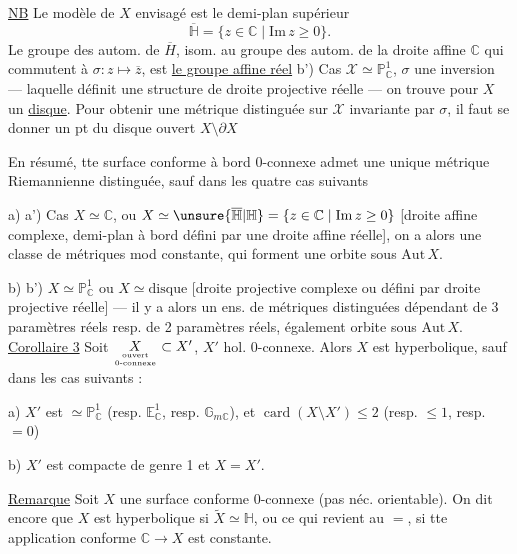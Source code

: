 \uline{NB}  Le modèle de $X$ envisagé est le demi-plan supérieur 
\[
\overline{\mathbb H}=\{z\in\mathbb C\mid\mathrm{Im}\,z\geq0\}.
\]
Le groupe des autom. de $\overline H$, isom. au groupe des autom. de la droite affine $\mathbb C$ qui commutent à $\sigma:z\longmapsto\overline z$, est \uline{le groupe affine réel}
b') Cas $\mathcal X\simeq\mathbb P^1_{\mathbb C}$, $\sigma$ une inversion --- laquelle définit une structure de droite projective réelle --- on trouve  pour $X$ un \uline{disque}. Pour obtenir une métrique distinguée sur $\mathcal X$ invariante par $\sigma$, il faut se donner un pt du disque ouvert $X\setminus\partial X$


En résumé, tte surface conforme à bord 0-connexe admet une unique métrique Riemannienne distinguée, sauf dans les quatre cas suivants

a) a') Cas $X\simeq\mathbb C$, ou $X\simeq\unsure{\overline{\mathbb H}|\mathbb H}=\{z\in\mathbb C\mid\mathrm{Im}\,z\geq0\}$ [droite affine complexe, demi-plan à bord défini par une droite affine réelle], on a alors une classe de métriques mod constante, qui forment une orbite sous $\mathrm{Aut}\,X$.

b) b') $X\simeq\mathbb P^1_{\mathbb C}$ ou $X\simeq\text{disque}$ [droite projective complexe ou  défini par droite projective réelle] --- il y a alors un ens. de métriques distinguées dépendant de 3 paramètres réels resp. de 2 paramètres réels, également orbite sous $\mathrm{Aut}\,X$.
\uline{Corollaire 3} Soit $\underset{\text{ouvert}\atop\text{0-connexe}}{X}\subset X'$, $X'$ hol. 0-connexe. Alors $X$ est hyperbolique, sauf dans les cas suivants :

a) $X'$ est $\simeq\mathbb P^1_{\mathbb C}$ (resp. $\mathbb E^1_{\mathbb C}$, resp. $\mathbb G_{m\mathbb C}$), et $\operatorname{card}(X\setminus X')\leq2$ (resp. $\leq1$, resp. $=0$)

b) $X'$ est compacte de genre 1 et $X=X'$.

\uline{Remarque} Soit  $X$ une surface conforme 0-connexe (pas néc. orientable). On dit encore que $X$ est hyperbolique si $\widetilde X\simeq\mathbb H$, ou ce qui revient au $=$, si tte application conforme $\mathbb C\longrightarrow X$ est constante.

